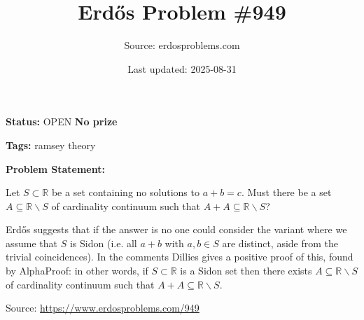 \documentclass{article}
\title{Erd\H{o}s Problem \#949}
\date{Last updated: 2025-08-31}
\author{Source: erdosproblems.com}
\begin{document}
\maketitle

\noindent\textbf{Status:} OPEN \quad \textbf{No prize}

\noindent\textbf{Tags:} ramsey theory

\medskip

\noindent\textbf{Problem Statement:}

Let $S\subset \mathbb{R}$ be a set containing no solutions to $a+b=c$. Must there be a set $A\subseteq \mathbb{R}\backslash S$ of cardinality continuum such that $A+A\subseteq \mathbb{R}\backslash S$?




Erd\H{o}s suggests that if the answer is no one could consider the variant where we assume that $S$ is Sidon (i.e. all $a+b$ with $a,b\in S$ are distinct, aside from the trivial coincidences). In the comments Dillies gives a positive proof of this, found by AlphaProof: in other words, if $S\subset \mathbb{R}$ is a Sidon set then there exists $A\subseteq \mathbb{R}\backslash S$ of cardinality continuum such that $A+A\subseteq \mathbb{R}\backslash S$.


\bigskip
\noindent\small{Source: \url{https://www.erdosproblems.com/949}}
\end{document}
